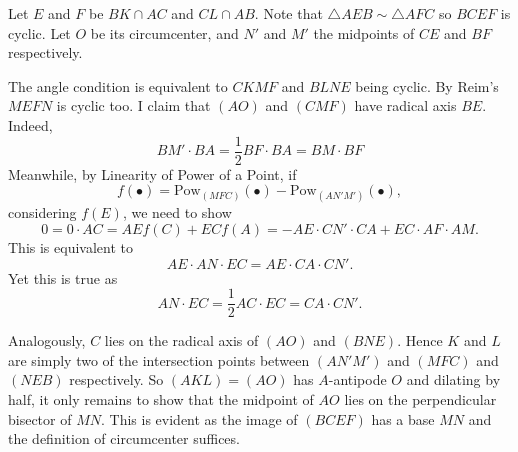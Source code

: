 \documentclass[11pt]{article}
\begin{document}
\begin{figure}[H]
\end{figure}
Let $E$ and $F$ be $BK \cap AC$ and $CL \cap AB$. Note that $\triangle AEB \sim \triangle AFC$ so $BCEF$ is cyclic. Let $O$ be its circumcenter, and $N'$ and $M'$ the midpoints of $CE$ and $BF$ respectively.

\medskip
The angle condition is equivalent to $CKMF$ and $BLNE$ being cyclic. By Reim's $MEFN$ is cyclic too. I claim that $(AO)$ and $(CMF)$ have radical axis $BE$. Indeed,
\[BM' \cdot BA = \frac 12 BF\cdot BA = BM \cdot BF\]
Meanwhile, by Linearity of Power of a Point, if $$f(\bullet) = \mathrm{Pow}_{(MFC)}(\bullet)-\mathrm{Pow}_{(AN'M')}(\bullet),$$ considering $f(E)$, we need to show
\[0= 0 \cdot AC = AE f(C) + ECf(A) = - AE\cdot CN' \cdot CA + EC \cdot AF \cdot AM.  \]This is equivalent to
\[AE\cdot AN \cdot EC = AE\cdot CA\cdot CN'.\]Yet this is true as $$AN \cdot EC = \frac 12 AC \cdot EC  = CA \cdot CN'.$$

\medskip
Analogously, $C$ lies on the radical axis of $(AO)$ and $(BNE)$. Hence $K$ and $L$ are simply two of the intersection points between $(AN'M')$ and $(MFC)$ and $(NEB)$ respectively. So $(AKL)=(AO)$ has $A$-antipode $O$ and dilating by half, it only remains to show that the midpoint of $AO$ lies on the perpendicular bisector of $MN$. This is evident as the image of $(BCEF)$ has a base $MN$ and the definition of circumcenter suffices.

\newpage
\end{document}

